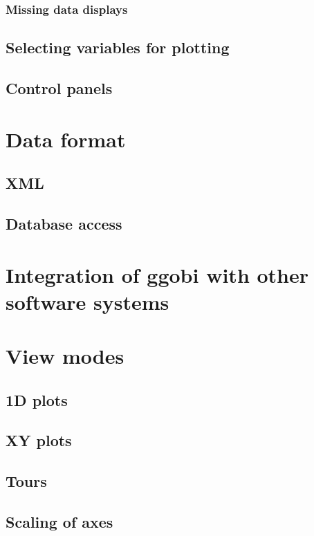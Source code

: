 \documentclass[11pt]{article}
\begin{document}
\subsubsection{Missing data displays}


\subsection{Selecting variables for plotting}
\subsection{Control panels}

\section{Data format}
\label{slbl:DataFormat}
\subsection {XML}
\label{slbl:XML}
\subsection {Database access}
\label{slbl:MySQL}

\section{Integration of ggobi with other software systems}
\label{slbl:Integration}

\section{View modes}
\label{slbl:ViewModes}

\subsection{1D plots}
\subsection{XY plots}
\subsection{Tours}
\label{slbl:1DTour}


\subsection{Scaling of axes}
\label{slbl:Scaling}
\end{document}
